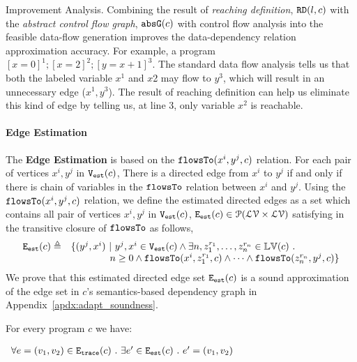 {Improvement Analysis.}
Combining the result of \emph{reaching definition}, $\mathtt{RD}(l, c)$
with the \emph{abstract control flow graph}, $\mathtt{abs}{\mathtt{G}}(c)$ with control flow analysis into the feasible 
data-flow generation improves the data-dependency relation approximation accuracy. 
For example, a program $ [x = 0]^{1}; [x=2]^{2};  [y = x+1]^{3}$. 
The standard data flow analysis 
tells us that both the labeled variable $x^{1}$ and $x${2} may flow to $y^{3}$, which will result in an unnecessary edge ($x^{1}, y^{3}$). The result of reaching definition 
can help us eliminate this kind of edge by telling us, at line $3$, only variable $x^{2}$ is reachable. 
\paragraph{Edge Estimation}
The \textbf{Edge Estimation}
is based on the $\mathtt{flowsTo}(x^i, y^j, c)$ relation.
For each pair of vertices $x^i, y^j$ in $\mathtt{{V_{est}}}(c)$,
There is a directed edge from  $x^i$ to $y^j$ if and only if there is chain of variables 
in the $\mathtt{flowsTo}$ relation between $x^i$ and $y^j$. 
Using the $\mathtt{flowsTo}(x^i, y^j, c)$ relation, we define the estimated directed edges as a set which contains all
pair of vertices $x^i, y^j$ in $\mathtt{{V_{est}}}(c)$, 
$\mathtt{{E_{est}}}(c) \in \mathcal{P}( \mathcal{LV} \times \mathcal{LV})$
satisfying in the transitive closure of $\mathtt{flowsTo}$ as follows,
{
  \[
    \begin{array}{ll}
    \mathtt{{E_{est}}}(c) \triangleq &
    \{ 
    (y^j, x^i) ~ \vert ~ y^j, x^i \in \mathtt{{V_{est}}}(c)
    \land
      \exists n,
      z_1^{r_1}, \ldots, z_n^{r_n} \in \mathbb{LV}(c) ~.~ 
    \\ & \qquad \qquad
      n \geq 0 \land \mathtt{flowsTo}(x^i,  z_1^{r_1}, c) 
      \land \cdots \land \mathtt{flowsTo}(z_n^{r_n}, y^j, c) 
    \}
    \end{array}
    \]
}
We prove that this estimated directed edge set $\mathtt{{E_{est}}}(c)$ is a sound approximation of the 
edge set in $c$'s semantics-based dependency graph 
in Appendix~\ref{apdx:adapt_soundness}.
\begin{lem}
	For every program $c$ we have:
   \begin{center}
$
	\begin{array}{l}
	\forall e = (v_1, v_2) \in \mathtt{{E_{trace}}}(c)
	~.~ 
	\exists e' \in \mathtt{{E_{est}}}(c) ~.~ e' = (v_1, v_2)
	\end{array}
$
\end{center} 
\end{lem}
